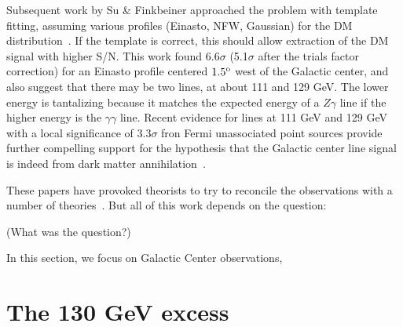 \documentclass[aps,twocolumn,prd,superscriptaddress,showpacs,nofootinbib,fixfloat]{revtex4}
\newcommand{\degree}{^{\rm o}}
\begin{document}
Subsequent work by Su \& Finkbeiner approached the problem
with template fitting, assuming various profiles (Einasto,
NFW, Gaussian) for the DM distribution~\citep{linepaper}.
If the template is correct, this should allow extraction of
the DM signal with higher S/N.  This work found 6.6$\sigma$
(5.1$\sigma$ after the trials factor correction) for an
Einasto profile centered $1.5\degree$ west of the Galactic
center, and also suggest that there may be two lines, at
about 111 and 129 GeV.  The lower energy is tantalizing
because it matches the expected energy of a $Z\gamma$ line
if the higher energy is the $\gamma\gamma$ line.  Recent
evidence for lines at 111 GeV and 129 GeV with a local
significance of $3.3\sigma$ fron Fermi unassociated point
sources provide further compelling support for the
hypothesis that the Galactic center line signal is indeed
from dark matter annihilation~\cite{doubleline}.

These papers have provoked theorists to try to reconcile the
observations with a number of
theories~\citep{Dudas:2012,Choi:2012,Kyae:2012,Lee:2012,Rajaraman:2012,Acharya:2012,Garny:2012,Buckley:2012,Chu:2012,Kang:2012,Buchmuller:2012,Heo:2012,Park:2012,Tulin:2012,Cline:2012,Weiner:2012}.
But all of this work depends on the question:

(What was the question?)



In this section, we focus on Galactic Center observations, 


\section{The 130 GeV excess}
\end{document}
